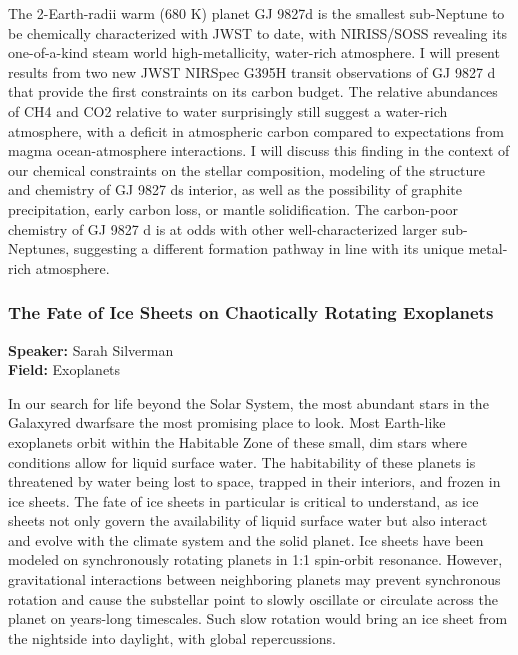 The 2-Earth-radii warm (680 K) planet GJ 9827d is the smallest sub-Neptune to be chemically characterized with JWST to date, with NIRISS/SOSS revealing its one-of-a-kind steam world high-metallicity, water-rich atmosphere. I will present results from two new JWST NIRSpec G395H transit observations of GJ 9827 d that provide the first constraints on its carbon budget. The relative abundances of CH4 and CO2 relative to water surprisingly still suggest a water-rich atmosphere, with a deficit in atmospheric carbon compared to expectations from magma ocean-atmosphere interactions. I will discuss this finding in the context of our chemical constraints on the stellar composition, modeling of the structure and chemistry of GJ 9827 ds interior, as well as the possibility of graphite precipitation, early carbon loss, or mantle solidification. The carbon-poor chemistry of GJ 9827 d is at odds with other well-characterized larger sub-Neptunes, suggesting a different formation pathway in line with its unique metal-rich atmosphere.

\hypertarget{abstract-talk-23}{}\label{abstract-page-talk-23}
\subsubsection*{The Fate of Ice Sheets on Chaotically Rotating Exoplanets}
\textbf{Speaker:} Sarah Silverman\\
\textbf{Field:} Exoplanets

In our search for life beyond the Solar System, the most abundant stars in the Galaxyred dwarfsare the most promising place to look. Most Earth-like exoplanets orbit within the Habitable Zone of these small, dim stars where conditions allow for liquid surface water. The habitability of these planets is threatened by water being lost to space, trapped in their interiors, and frozen in ice sheets. The fate of ice sheets in particular is critical to understand, as ice sheets not only govern the availability of liquid surface water but also interact and evolve with the climate system and the solid planet. Ice sheets have been modeled on synchronously rotating planets in 1:1 spin-orbit resonance. However, gravitational interactions between neighboring planets may prevent synchronous rotation and cause the substellar point to slowly oscillate or circulate across the planet on years-long timescales. Such slow rotation would bring an ice sheet from the nightside into daylight, with global repercussions.

